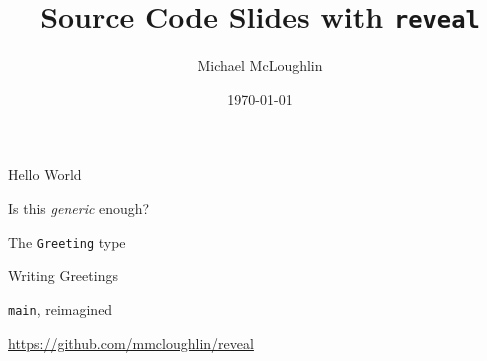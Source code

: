 \documentclass[aspectratio=169,14pt]{beamer}
\title{Source Code Slides with \texttt{reveal}}
\date{\today}
\author{Michael McLoughlin}
\begin{document}
\maketitle

\begin{frame}{Hello World}


\end{frame}

\begin{frame}[standout]
  Is this \emph{generic} enough?
\end{frame}

\begin{frame}{The \texttt{Greeting} type}


\end{frame}

\begin{frame}{Writing Greetings}


  \begin{small}
  \end{small}

\end{frame}

\begin{frame}{\texttt{main}, reimagined}

  \begin{small}
  \end{small}

\end{frame}

\begin{frame}
  \begin{center}
  {\large \url{https://github.com/mmcloughlin/reveal}}
  \end{center}
\end{frame}
\end{document}
